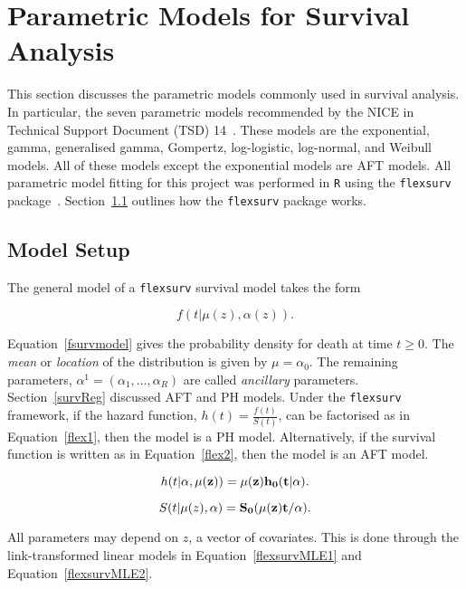 \section{Parametric Models for Survival Analysis}
This section discusses the parametric models commonly used in survival analysis. In particular, the seven parametric models recommended by the NICE in Technical Support Document (TSD) 14~\cite{tsd14}. These models are the exponential, gamma, generalised gamma, Gompertz, log-logistic, log-normal, and Weibull models. All of these models except the exponential models are AFT models. All parametric model fitting for this project was performed in \verb|R| using the \verb|flexsurv| package~\cite{flexsurv}. Section~\ref{flexSetup} outlines how the \verb|flexsurv| package works.

\subsection{Model Setup}\label{flexSetup}
The general model of a \verb|flexsurv| survival model takes the form 

\begin{equation}
    \label{fsurvmodel}
    f(t|\mu(z), \alpha(z)).
\end{equation}

Equation~\ref{fsurvmodel} gives the probability density for death at time $t \geq 0$. The \textit{mean} or \textit{location} of the distribution is given by $\mu = \alpha_0$. The remaining parameters, $\alpha^1 = (\alpha_1, \ldots, \alpha_R)$ are called \textit{ancillary} parameters. \\

Section~\ref{survReg} discussed AFT and PH models. Under the \verb|flexsurv| framework, if the hazard function, $h(t) = \frac{f(t)}{S(t)}$, can be factorised as in Equation~\ref{flex1}, then the model is a PH model. Alternatively, if the survival function is written as in Equation~\ref{flex2}, then the model is an AFT model.

\begin{equation}
    h(t|\bf{\alpha}, \mu(z)) = \mu(z)h_0(t|\alpha). 
    \label{flex1}
\end{equation}

\begin{equation}
    S(t|\mu(z), \bf{\alpha}) = S_0(\mu(z)t/\alpha).  
    \label{flex2}
\end{equation}

All parameters may depend on $z$, a vector of covariates. This is done through the link-transformed linear models in Equation~\ref{flexsurvMLE1} and Equation~\ref{flexsurvMLE2}.

